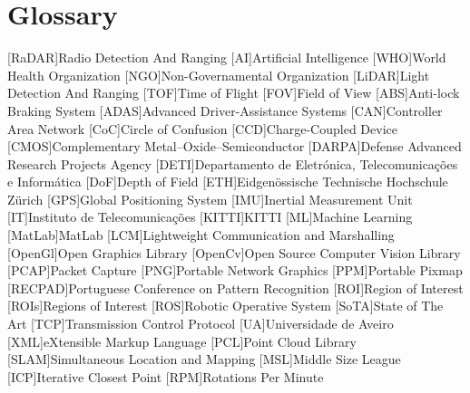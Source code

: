 \chapter{Glossary}

\footnotesize
\SingleSpacing

\begin{multicols}{2} 
\begin{acronym}[AAAAAA]
	[RaDAR]{Radio Detection And Ranging}
	[AI]{Artificial Intelligence}
	[WHO]{World Health Organization}
	[NGO]{Non-Governamental Organization} 
	[LiDAR]{Light Detection And Ranging}
	[TOF]{Time of Flight} 
	[FOV]{Field of View}
	[ABS]{Anti-lock Braking System}
	[ADAS]{Advanced Driver-Assistance Systems}
	[CAN]{Controller Area Network} 
	[CoC]{Circle of Confusion}
	[CCD]{Charge-Coupled Device}
	[CMOS]{Complementary Metal–Oxide–Semiconductor}
	[DARPA]{Defense Advanced Research Projects Agency}
	[DETI]{Departamento de Eletrónica, Telecomunicações e Informática}
	[DoF]{Depth of Field}
	[ETH]{Eidgenössische Technische Hochschule Zürich}
	[GPS]{Global Positioning System}
	[IMU]{Inertial Measurement Unit}
	[IT]{Instituto de Telecomunicações}
	[KITTI]{KITTI}
	[ML]{Machine Learning}
	[MatLab\textsuperscript{\tiny\textregistered}]{MatLab\textsuperscript{\tiny\textregistered}}
	[LCM]{Lightweight Communication and Marshalling}
	[OpenGl]{Open Graphics Library}
	[OpenCv]{Open Source Computer Vision Library}
	[PCAP]{Packet Capture}
	[PNG]{Portable Network Graphics}
	[PPM]{Portable Pixmap}
	[RECPAD]{Portuguese Conference on Pattern Recognition}
	[ROI]{Region of Interest}
	[ROIs]{Regions of Interest}
	[ROS]{Robotic Operative System} 
	[SoTA]{State of The Art}
	[TCP]{Transmission Control Protocol}
	[UA]{Universidade de Aveiro}
	[XML]{eXtensible Markup Language}
	[PCL]{Point Cloud Library}
	[SLAM]{Simultaneous Location and Mapping} 
	[MSL]{Middle Size League}
	[ICP]{Iterative Closest Point}
	[RPM]{Rotations Per Minute}
\end{acronym}
\end{multicols}

